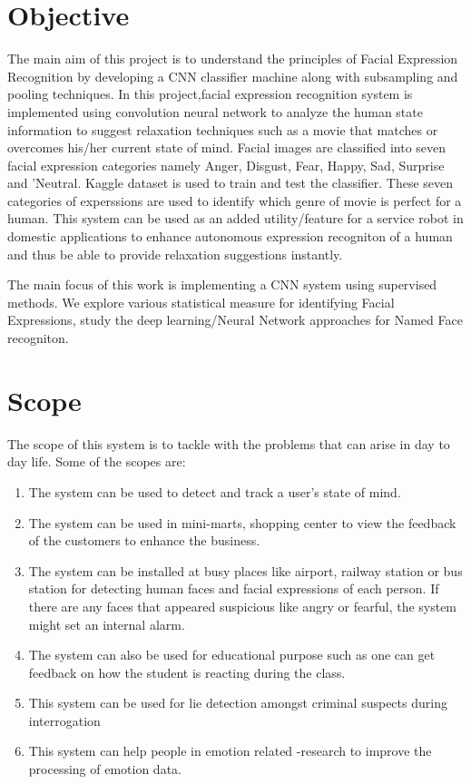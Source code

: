\documentclass[12pt,a4paper,final]{extreport}
\begin{document}
\section{Objective}
The main aim of this project is to understand the principles of Facial Expression Recognition by developing a CNN classifier machine along with subsampling and pooling techniques.
\vspace{0.5cm}
In this project,facial expression recognition system is implemented using convolution neural
network to analyze the human state information to suggest relaxation techniques such as a movie that matches or overcomes his/her current state of mind. Facial images are classified into seven facial expression categories namely Anger,
Disgust, Fear, Happy, Sad, Surprise and 'Neutral. Kaggle dataset is used to train and test the
classifier. These seven categories of experssions are used to identify which genre of movie is perfect for a human.
\vspace{0.5cm}
This system can be used as an added utility/feature for a service robot in domestic applications to enhance autonomous expression recogniton of a human and thus be able to provide relaxation suggestions instantly.

\vspace{1cm}

The main focus of this work is implementing a CNN system using supervised methods. We explore various statistical measure for identifying Facial Expressions, study the deep learning/Neural Network approaches for Named Face recogniton.
\section{Scope}
The scope of this system is to tackle with the problems that can arise in day to day life.
Some of the scopes are:

\begin{enumerate}
	\item The system can be used to detect and track a user’s state of mind.
	\item The system can be used in mini-marts, shopping center to view the feedback of the customers to enhance the business.
	\item The system can be installed at busy places like airport, railway station or bus station for detecting human faces and facial expressions of each person. If there are any faces that appeared suspicious like angry or fearful, the system might set an internal alarm.
	\item The system can also be used for educational purpose such as one can get feedback on how the student is reacting during the class.
	\item This system can be used for lie detection amongst criminal suspects during interrogation
	\item This system can help people in emotion related -research to improve the processing of emotion data.\end{enumerate}
\end{document}

